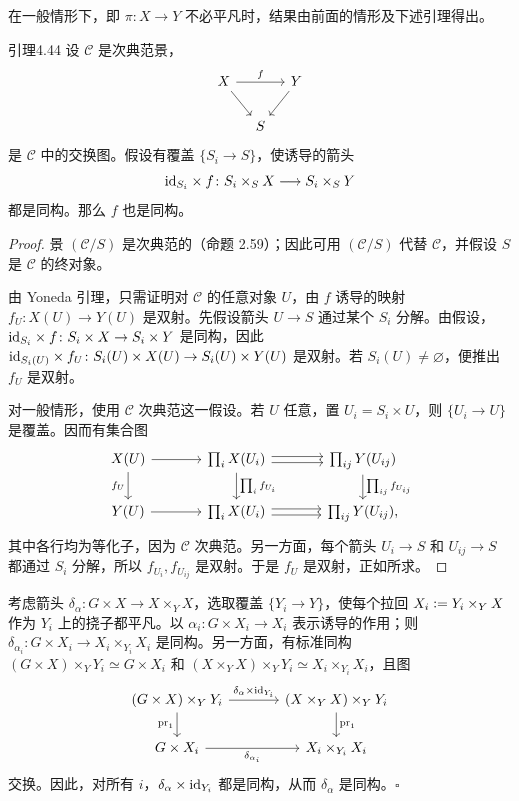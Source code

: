 在一般情形下，即 $\pi\colon X\to Y$ 不必平凡时，结果由前面的情形及下述引理得出。

\begin{origstatement}{引理}{4.44}\label{ch04:lem444}
设 $\mathcal C$ 是次典范景，
\[
\begin{tikzcd}[column sep=1em]
 X\arrow[rr,"{f}"]\arrow[dr]&&Y\arrow[dl]\\
 &S
\end{tikzcd}
\]
是 $\mathcal C$ 中的交换图。假设有覆盖 $\{S_i\to S\}$，使诱导的箭头
\[
 \mathrm{id}_{S_i}\times f\colon S_i\times_S X\longrightarrow S_i\times_S Y
\]
都是同构。那么 $f$ 也是同构。
\end{origstatement}
\begin{proof}
景 $(\mathcal C/S)$ 是次典范的（命题 2.59）；因此可用 $(\mathcal C/S)$ 代替 $\mathcal C$，并假设 $S$ 是 $\mathcal C$ 的终对象。

由 Yoneda 引理，只需证明对 $\mathcal C$ 的任意对象 $U$，由 $f$ 诱导的映射 $f_U\colon X(U)\to Y(U)$ 是双射。先假设箭头 $U\to S$ 通过某个 $S_i$ 分解。由假设，$\mathrm{id}_{S_i}\times f\colon S_i\times X\to S_i\times Y$ 是同构，因此
$\mathrm{id}_{S_i(U)}\times f_U\colon S_i(U)\times X(U)\to S_i(U)\times Y(U)$ 是双射。若 $S_i(U)\ne\varnothing$，便推出 $f_U$ 是双射。

对一般情形，使用 $\mathcal C$ 次典范这一假设。若 $U$ 任意，置 $U_i=S_i\times U$，则 $\{U_i\to U\}$ 是覆盖。因而有集合图
\[
\begin{tikzcd}[column sep=large]
 X(U)\arrow[r]\arrow[d,"{f_U}"']&\prod_i X(U_i)\arrow[r,shift left=.5ex]\arrow[r,shift right=.5ex]\arrow[d,"{\prod_i f_{U_i}}"]&\prod_{ij}Y(U_{ij})\arrow[d,"{\prod_{ij}f_{U_{ij}}}"]\\
 Y(U)\arrow[r]&\prod_i X(U_i)\arrow[r,shift left=.5ex]\arrow[r,shift right=.5ex]&\prod_{ij}Y(U_{ij}),
\end{tikzcd}
\]
其中各行均为等化子，因为 $\mathcal C$ 次典范。另一方面，每个箭头 $U_i\to S$ 和 $U_{ij}\to S$ 都通过 $S_i$ 分解，所以 $f_{U_i},f_{U_{ij}}$ 是双射。于是 $f_U$ 是双射，正如所求。
\end{proof}

考虑箭头 $\delta_\alpha\colon G\times X\to X\times_Y X$，选取覆盖 $\{Y_i\to Y\}$，使每个拉回 $X_i\mathrel{\mathop:}= Y_i\times_Y X$ 作为 $Y_i$ 上的挠子都平凡。以 $\alpha_i\colon G\times X_i\to X_i$ 表示诱导的作用；则 $\delta_{\alpha_i}\colon G\times X_i\to X_i\times_{Y_i}X_i$ 是同构。另一方面，有标准同构
$(G\times X)\times_Y Y_i\simeq G\times X_i$ 和 $(X\times_Y X)\times_Y Y_i\simeq X_i\times_{Y_i}X_i$，且图
\[
\begin{tikzcd}[column sep=large]
 (G\times X)\times_Y Y_i\arrow[r,"{\delta_\alpha\times\id_{Y_i}}"]\arrow[d,"{\operatorname{pr}_1}"']&(X\times_Y X)\times_Y Y_i\arrow[d,"{\operatorname{pr}_1}"]\\
 G\times X_i\arrow[r,"{\delta_{\alpha_i}}"']&X_i\times_{Y_i}X_i
\end{tikzcd}
\]
交换。因此，对所有 $i$，$\delta_\alpha\times\mathrm{id}_{Y_i}$ 都是同构，从而 $\delta_\alpha$ 是同构。\hfill$\square$

